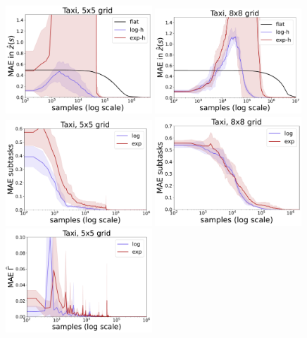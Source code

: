   \begin{figure}[!hb]
    \begin{center}
        \includegraphics*[width=0.49\textwidth]{figures/chapter2/online/taxi_5_1.png}
        \includegraphics*[width=0.49\textwidth]{figures/chapter2/online/taxi_8_1.png}
        \includegraphics*[width=0.49\textwidth]{figures/chapter2/online/taxi_5_subtask_1.png}
        \includegraphics*[width=0.49\textwidth]{figures/chapter2/online/taxi_8_subtask_1.png}
        \includegraphics*[width=0.49\textwidth]{figures/chapter2/online/taxi_5_gammas_1.png}

\end{center}
\end{figure}
